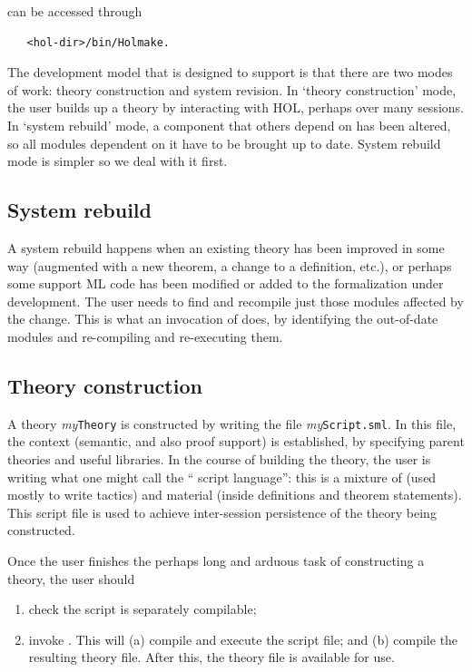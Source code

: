 \holmake{} can be accessed through
\begin{verbatim}
   <hol-dir>/bin/Holmake.
\end{verbatim}

The development model that \holmake{} is designed to support is that
there are two modes of work: theory construction and system revision.
In `theory construction' mode, the user builds up a theory by
interacting with HOL, perhaps over many sessions. In `system rebuild'
mode, a component that others depend on has been altered, so all modules
dependent on it have to be brought up to date. System rebuild mode is
simpler so we deal with it first.

\subsection{System rebuild}

A system rebuild happens when an existing theory has been improved in
some way (augmented with a new theorem, a change to a definition,
etc.), or perhaps some support ML code has been modified or added to
the formalization under development. The user needs to find and
recompile just those modules affected by the change. This is what an
invocation of \holmake{} does, by identifying the out-of-date modules
and re-compiling and re-executing them.


\subsection{Theory construction}

A theory \emph{my}\texttt{Theory} is constructed by writing the file \emph{my}\texttt{Script.sml}.
In this file, the context (semantic, and also proof support) is established, by specifying parent theories and useful libraries.
In the course of building the theory, the user is writing what one might call the ``\HOL{} script language'': this is a mixture of \ML{} (used mostly to write tactics) and \HOL{} material (inside definitions and theorem statements).
This script file is used to achieve inter-session persistence of
the theory being constructed.

Once the user finishes the perhaps long and arduous task of constructing
a theory, the user should
\begin{enumerate}
\item check the script is separately compilable;
\item invoke \holmake{}. This will (a) compile and execute the
  script file; and (b) compile the resulting theory file. After this,
  the theory file is available for use.
\end{enumerate}

